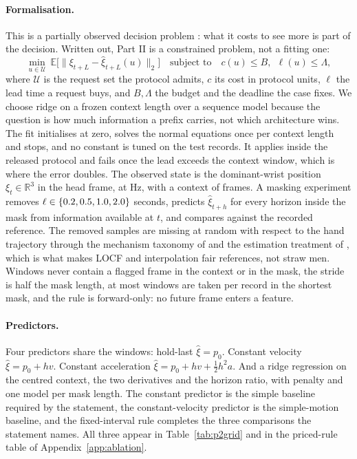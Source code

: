 \documentclass{swmcmthesis}
\begin{document}
\paragraph{Formalisation.} This is a partially observed decision problem
\cite{kaelbling1998}: what it costs to see more is part of the decision. Written
out, Part II is a constrained problem, not a fitting one:
\begin{equation}
\min_{u\in\mathcal{U}}\ \mathbb{E}\big[\lVert\xi_{t+L}-\hat\xi_{t+L}(u)\rVert_2\big]
\quad\text{subject to}\quad c(u)\le B,\ \ \ell(u)\le\Lambda,
\label{eq:p2dec}
\end{equation}
where $\mathcal{U}$ is the request set the protocol admits, $c$ its cost in protocol
units, $\ell$ the lead time a request buys, and $B,\Lambda$ the budget and the deadline
the case fixes. We choose ridge on a frozen context length over a sequence model
because the question is how much information a prefix carries, not which architecture
wins. The fit initialises at zero, solves the normal equations once per context length
and stops, and no constant is tuned on the test records. It applies inside the released protocol and fails once the lead
exceeds the context window, which is where the error doubles. The observed
state is the dominant-wrist position
$\xi_t\in\mathbb{R}^{3}$ in the head frame, at \slotFPS{} Hz, with a context of
\slotCtx{} frames. A masking experiment removes $\ell\in\{0.2{},
0.5{},1.0{},2.0{}\}$ seconds, predicts $\hat\xi_{t+h}$ for
every horizon inside the mask from information available at $t$, and compares
against the recorded reference. The removed samples are missing at random with respect
to the hand trajectory through the mechanism taxonomy of \cite{rubin1976} and the estimation treatment of \cite{little2019}, which is what makes LOCF and interpolation fair
references, not straw men. Windows never contain a flagged frame in the
context or in the mask, the stride is half the mask length, at most
\slotPTwoWinA{} windows are taken per record in the shortest mask, and the rule is
forward-only: no future frame enters a feature.

\paragraph{Predictors.} Four predictors share the windows: hold-last
$\hat\xi=p_0$. Constant velocity $\hat\xi=p_0+hv$. Constant acceleration
$\hat\xi=p_0+hv+\tfrac12h^{2}a$. And a ridge regression on the centred context,
the two derivatives and the horizon ratio, with penalty \slotRidgeAlpha{} and one
model per mask length. The constant predictor is the simple baseline required by
the statement, the constant-velocity predictor is the simple-motion baseline, and
the fixed-interval rule completes the three comparisons the statement names. All three
appear in Table~\ref{tab:p2grid} and in the priced-rule table of
Appendix~\ref{app:ablation}.
\end{document}
